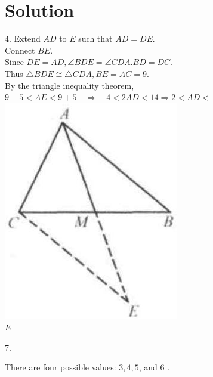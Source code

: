 \documentclass{article}
\begin{document}
\section*{Solution}
4.
Extend \(A D\) to \(E\) such that \(A D=D E\).\\
Connect \(B E\).\\
Since \(D E=A D, \angle B D E=\angle C D A . B D=D C\).\\
Thus \(\triangle B D E \cong \triangle C D A, B E=A C=9\).\\
By the triangle inequality theorem,\\
\(9-5<A E<9+5 \quad \Rightarrow \quad 4<2 A D<14 \Rightarrow 2<A D<\)\\
\centering
\includegraphics[width=\textwidth]{images/reasoning_image_1.jpg}\\
\(E\)

7.

There are four possible values: \(3,4,5\), and 6 .
\end{document}
